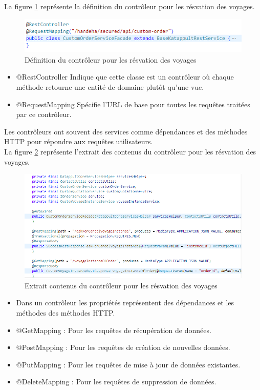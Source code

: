 \documentclass[12pt]{report}
\begin{document}
			La figure \ref{fig:controleur} représente la définition du contrôleur pour les résvation des voyages.
			
			\begin{figure}[h]
				\centering
				\includegraphics[width=\textwidth]{controleur.jpg}
				\caption{Définition du contrôleur pour les résvation des voyages}
				\label{fig:controleur}
			\end{figure}
			\FloatBarrier

			\begin{itemize}
				\item @RestController Indique que cette classe est un contrôleur où chaque méthode retourne une entité de domaine plutôt qu'une vue.
				\item @RequestMapping Spécifie l'URL de base pour toutes les requêtes traitées par ce contrôleur.
			\end{itemize}

			Les contrôleurs ont souvent des services comme dépendances et des méthodes HTTP pour répondre aux requêtes utilisateurs.\\

			La figure \ref{fig:contenuscontroleur} représente l'extrait des contenus du contrôleur pour les résvation des voyages.
			
			\begin{figure}[h]
				\centering
				\includegraphics[width=\textwidth]{contenuscontroleur.jpg}
				\caption{Extrait contenus du contrôleur pour les résvation des voyages}
				\label{fig:contenuscontroleur}
			\end{figure}
			\FloatBarrier
			\begin{itemize}
				\item Dans un contrôleur les propriétés représentent des dépendances et les méthodes des méthodes HTTP.
				\item @GetMapping : Pour les requêtes de récupération de données.
				\item @PostMapping : Pour les requêtes de création de nouvelles données.
				\item @PutMapping : Pour les requêtes de mise à jour de données existantes.
				\item @DeleteMapping : Pour les requêtes de suppression de données.
			\end{itemize}
			
\end{document}
